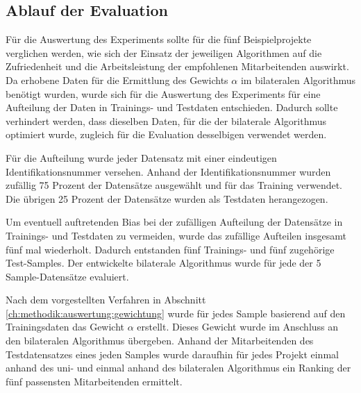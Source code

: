 


\subsection{Ablauf der Evaluation}
\label{ch:methodik:auswertung:ablauf}
Für die Auswertung des Experiments sollte für die fünf Beispielprojekte verglichen werden, wie sich der Einsatz der jeweiligen Algorithmen auf die Zufriedenheit und die Arbeitsleistung der empfohlenen Mitarbeitenden auswirkt.
Da erhobene Daten für die Ermittlung des Gewichts $\alpha$ im bilateralen Algorithmus benötigt wurden, wurde sich für die Auswertung des Experiments für eine Aufteilung der Daten in Trainings- und Testdaten entschieden.
Dadurch sollte verhindert werden, dass dieselben Daten, für die der bilaterale Algorithmus optimiert wurde, zugleich für die Evaluation desselbigen verwendet werden.

Für die Aufteilung wurde jeder Datensatz mit einer eindeutigen Identifikationsnummer versehen.
Anhand der Identifikationsnummer wurden zufällig 75 Prozent der Datensätze ausgewählt und für das Training verwendet.
Die übrigen 25 Prozent der Datensätze wurden als Testdaten herangezogen.

Um eventuell auftretenden Bias bei der zufälligen Aufteilung der Datensätze in Trainings- und Testdaten zu vermeiden, wurde das zufällige Aufteilen insgesamt fünf mal wiederholt.
Dadurch entstanden fünf Trainings- und fünf zugehörige Test-Samples.
Der entwickelte bilaterale Algorithmus wurde für jede der 5 Sample-Datensätze evaluiert.

Nach dem vorgestellten Verfahren in Abschnitt \ref{ch:methodik:auswertung:gewichtung} wurde für jedes Sample basierend auf den Trainingsdaten das Gewicht $\alpha$ erstellt.
Dieses Gewicht wurde im Anschluss an den bilateralen Algorithmus übergeben.
Anhand der Mitarbeitenden des Testdatensatzes eines jeden Samples wurde daraufhin für jedes Projekt einmal anhand des uni- und einmal anhand des bilateralen Algorithmus ein Ranking der fünf passensten Mitarbeitenden ermittelt.

